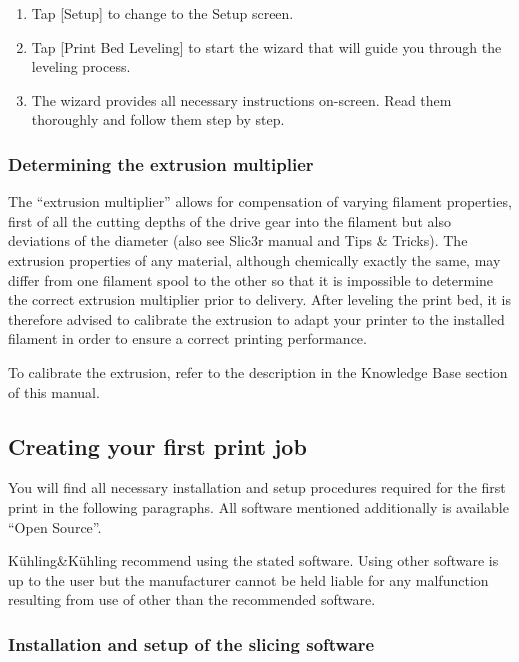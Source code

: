 \begin{enumerate}
  \item Tap [Setup] to change to the Setup screen.
  \item Tap [Print Bed Leveling] to start the wizard that will guide you through the 
        leveling process.
  \item The wizard provides all necessary instructions on-screen. Read them thoroughly 
        and follow them step by step.
\end{enumerate}

\subsubsection{Determining the extrusion multiplier}

The “extrusion multiplier” allows for compensation of varying filament properties, first of all the cutting depths of the drive gear into the filament but also deviations of the diameter (also see Slic3r manual and Tips \& Tricks). The extrusion properties of any material, although chemically exactly the same, may differ from one filament spool to the other so that it is impossible to determine the correct extrusion multiplier prior to delivery. After leveling the print bed, it is therefore advised to calibrate the extrusion to adapt your printer to the installed filament in order to ensure a correct printing performance. 

To calibrate the extrusion, refer to the description in the Knowledge Base section of this manual.

\subsection{Creating your first print job}

You will find all necessary installation and setup procedures required for the first print in the following paragraphs. All software mentioned additionally is available “Open Source”. 

\begin{info}
  Kühling\&Kühling recommend using the stated software. Using other software is up to the user but the manufacturer cannot be held liable for any malfunction resulting from use of other than the recommended software.
\end{info}

\subsubsection{Installation and setup of the slicing software}

